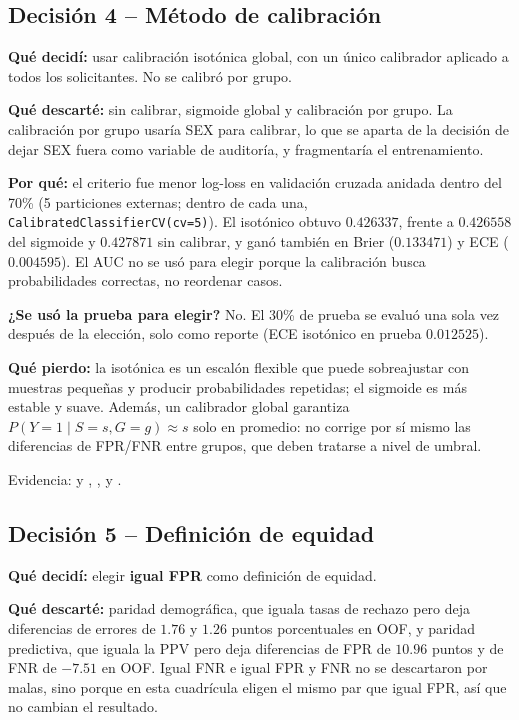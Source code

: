 \subsection*{Decisión 4 -- Método de calibración}

\textbf{Qué decidí:} usar calibración isotónica global, con un único
calibrador aplicado a todos los solicitantes. No se calibró por grupo.

\textbf{Qué descarté:} sin calibrar, sigmoide global y calibración por grupo.
La calibración por grupo usaría SEX para calibrar, lo que se aparta de la
decisión de dejar SEX fuera como variable de auditoría, y fragmentaría el
entrenamiento.

\textbf{Por qué:} el criterio fue menor log-loss en validación cruzada
anidada dentro del 70\% (5 particiones externas; dentro de cada una,
\texttt{CalibratedClassifierCV(cv=5)}). El isotónico obtuvo $0.426337$,
frente a $0.426558$ del sigmoide y $0.427871$ sin calibrar, y ganó también en
Brier ($0.133471$) y ECE ($0.004595$). El AUC no se usó para elegir porque la
calibración busca probabilidades correctas, no reordenar casos.

\textbf{¿Se usó la prueba para elegir?} No. El 30\% de prueba se evaluó una
sola vez después de la elección, solo como reporte (ECE isotónico en prueba
$0.012525$).

\textbf{Qué pierdo:} la isotónica es un escalón flexible que puede sobreajustar
con muestras pequeñas y producir probabilidades repetidas; el sigmoide es más
estable y suave. Además, un calibrador global garantiza
$P(Y=1\mid S=s,G=g)\approx s$ solo en promedio: no corrige por sí mismo las
diferencias de FPR/FNR entre grupos, que deben tratarse a nivel de umbral.

Evidencia:  y
,
,  y
.

\subsection*{Decisión 5 -- Definición de equidad}

\textbf{Qué decidí:} elegir \textbf{igual FPR} como definición de equidad.

\textbf{Qué descarté:} paridad demográfica, que iguala tasas de rechazo pero
deja diferencias de errores de $1.76$ y $1.26$ puntos porcentuales en OOF, y
paridad predictiva, que iguala la PPV pero deja diferencias de FPR de $10.96$
puntos y de FNR de $-7.51$ en OOF. Igual FNR e igual FPR y FNR no se
descartaron por malas, sino porque en esta cuadrícula eligen el mismo par que
igual FPR, así que no cambian el resultado.

